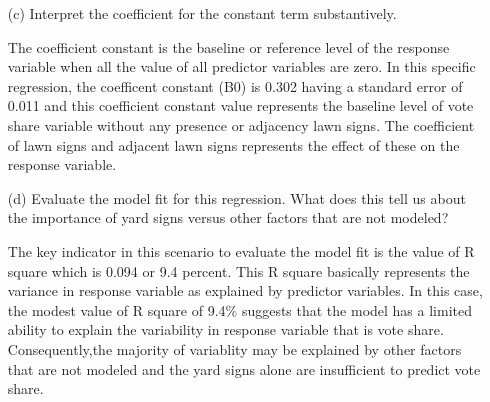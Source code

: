 \documentclass[12pt,letterpaper]{article}
\begin{document}
\begin{enumerate}
	
	\vspace{1cm}
	\item [(c)] Interpret the coefficient for the constant term substantively.
	\item[] The coefficient constant is the baseline or reference level of the response 
	variable when all the value of all predictor variables are zero. In this 
	specific regression, the coefficent constant (B0) is 0.302 having a standard
	error of 0.011 and this coefficient constant value represents the baseline 
	level of vote share variable without any presence or adjacency lawn signs.
	The coefficient of lawn signs and adjacent lawn signs represents the effect 
	of these on the response variable.



	\vspace{1cm}
	
	\item [(d)] Evaluate the model fit for this regression.  What does this	tell us about the importance of yard signs versus other factors that are not modeled?
	\item[] The key indicator in this scenario to evaluate the model fit is the value of 
	R square which is 0.094 or 9.4 percent. This R square basically represents 
	the variance in response variable as explained by predictor variables. In 
	this case, the modest value of R square of 9.4\% suggests that the model 
	has a limited ability to explain the variability in response variable that 
	is vote share. 
	Consequently,the majority of variablity may be explained by other factors 
	that are not modeled and the yard signs alone are insufficient to predict 
	vote share.
	
	
\end{enumerate}  
\end{document}
